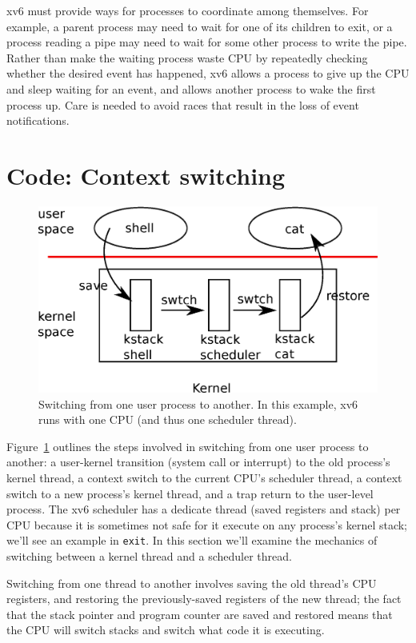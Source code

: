 xv6 must provide
ways for processes to coordinate among themselves. For example,
a parent process may need to wait for one of its children to
exit, or a process reading a pipe may need to wait for
some other process to write the pipe.
Rather than make the waiting process waste CPU by repeatedly checking
whether the desired event has happened, xv6 allows a process to give
up the CPU and sleep
waiting for an event, and allows another process to wake the first
process up. Care is needed to avoid races that result in
the loss of event notifications.
\section{Code: Context switching}

\begin{figure}[t]
\center
\includegraphics[scale=0.5]{fig/switch.eps}
\caption{Switching from one user process to another.  In this example, xv6 runs with one CPU (and thus one scheduler thread).}
\label{fig:switch}
\end{figure}

Figure~\ref{fig:switch} 
outlines the steps involved in switching from one
user process to another:
a user-kernel transition (system
call or interrupt) to the old process's kernel thread,
a context switch to the current CPU's scheduler thread, a context
switch to a new process's kernel thread, and a trap return
to the user-level process.
The xv6 scheduler has a dedicate thread (saved registers and stack)
per CPU because
it is sometimes not safe for it execute on
any process's kernel stack;
we'll see an example in
\lstinline{exit}.
In this section we'll examine the mechanics of switching
between a kernel thread and a scheduler thread.

Switching from one thread to another involves saving the old thread's
CPU registers, and restoring the previously-saved registers of the
new thread; the fact that
the stack pointer and program counter
are saved and restored means that the CPU will switch stacks and
switch what code it is executing.

